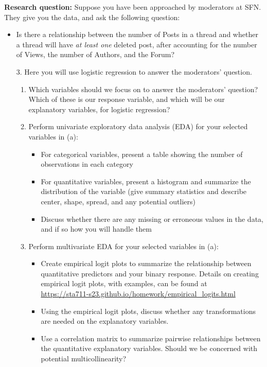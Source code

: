 \documentclass[11pt]{article}
\begin{document}
\noindent \textbf{Research question:} Suppose you have been approached by moderators at SFN. They give you the data, and ask the following question:
\begin{itemize}
\item Is there a relationship between the number of Posts in a thread and whether a thread will have \textit{at least one} deleted post, after accounting for the number of Views, the number of Authors, and the Forum?
\end{itemize}

\begin{enumerate}
\item[3.] Here you will use logistic regression to answer the moderators' question.

\begin{enumerate}
\item Which variables should we focus on to answer the moderators' question? Which of these is our response variable, and which will be our explanatory variables, for logistic regression?
\item Perform univariate exploratory data analysis (EDA) for your selected variables in (a): 
\begin{itemize}
\item For categorical variables, present a table showing the number of observations in each category
\item For quantitative variables, present a histogram and summarize the distribution of the variable (give summary statistics and describe center, shape, spread, and any potential outliers)
\item Discuss whether there are any missing or erroneous values in the data, and if so how you will handle them
\end{itemize}
\item Perform multivariate EDA for your selected variables in (a):
\begin{itemize}
\item Create empirical logit plots to summarize the relationship between quantitative predictors and your binary response. Details on creating empirical logit plots, with examples, can be found at\\ \url{https://sta711-s23.github.io/homework/empirical_logits.html}
\item Using the empirical logit plots, discuss whether any transformations are needed on the explanatory variables.
\item Use a correlation matrix to summarize pairwise relationships between the quantitative explanatory variables. Should we be concerned with potential multicollinearity?

\end{itemize}
\end{enumerate}
\end{enumerate}
\end{document}
